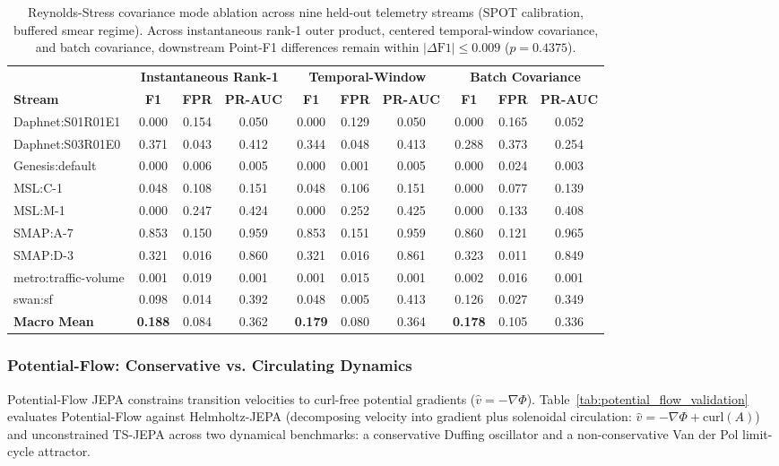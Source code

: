 \begin{table}[t]
\centering
\scriptsize
\caption{Reynolds-Stress covariance mode ablation across nine held-out telemetry streams (SPOT calibration, buffered smear regime). Across instantaneous rank-1 outer product, centered temporal-window covariance, and batch covariance, downstream Point-F1 differences remain within $|\Delta\mathrm{F1}| \le 0.009$ ($p=0.4375$).}\label{tab:reynolds_covmodes}
\scriptsize
\setlength{\tabcolsep}{2.5pt}
\begin{tabular}{@{}lccccccccc@{}}
\toprule
& \multicolumn{3}{c}{\textbf{Instantaneous Rank-1}} & \multicolumn{3}{c}{\textbf{Temporal-Window}} & \multicolumn{3}{c}{\textbf{Batch Covariance}} \\
\cmidrule(lr){2-4} \cmidrule(lr){5-7} \cmidrule(lr){8-10}
\textbf{Stream} & \textbf{F1} & \textbf{FPR} & \textbf{PR-AUC} & \textbf{F1} & \textbf{FPR} & \textbf{PR-AUC} & \textbf{F1} & \textbf{FPR} & \textbf{PR-AUC} \\
\midrule
Daphnet:S01R01E1 & 0.000 & 0.154 & 0.050 & 0.000 & 0.129 & 0.050 & 0.000 & 0.165 & 0.052 \\
Daphnet:S03R01E0 & 0.371 & 0.043 & 0.412 & 0.344 & 0.048 & 0.413 & 0.288 & 0.373 & 0.254 \\
Genesis:default  & 0.000 & 0.006 & 0.005 & 0.000 & 0.001 & 0.005 & 0.000 & 0.024 & 0.003 \\
MSL:C-1          & 0.048 & 0.108 & 0.151 & 0.048 & 0.106 & 0.151 & 0.000 & 0.077 & 0.139 \\
MSL:M-1          & 0.000 & 0.247 & 0.424 & 0.000 & 0.252 & 0.425 & 0.000 & 0.133 & 0.408 \\
SMAP:A-7         & 0.853 & 0.150 & 0.959 & 0.853 & 0.151 & 0.959 & 0.860 & 0.121 & 0.965 \\
SMAP:D-3         & 0.321 & 0.016 & 0.860 & 0.321 & 0.016 & 0.861 & 0.323 & 0.011 & 0.849 \\
metro:traffic-volume & 0.001 & 0.019 & 0.001 & 0.001 & 0.015 & 0.001 & 0.002 & 0.016 & 0.001 \\
swan:sf          & 0.098 & 0.014 & 0.392 & 0.048 & 0.005 & 0.413 & 0.126 & 0.027 & 0.349 \\
\midrule
\textbf{Macro Mean} & \textbf{0.188} & 0.084 & 0.362 & \textbf{0.179} & 0.080 & 0.364 & \textbf{0.178} & 0.105 & 0.336 \\
\bottomrule
\end{tabular}
\end{table}

\subsubsection{Potential-Flow: Conservative vs. Circulating Dynamics}
Potential-Flow JEPA constrains transition velocities to curl-free potential gradients ($\hat{v} = -\nabla\Phi$). Table~\ref{tab:potential_flow_validation} evaluates Potential-Flow against Helmholtz-JEPA (decomposing velocity into gradient plus solenoidal circulation: $\hat{v} = -\nabla\Phi + \text{curl}(A)$) and unconstrained TS-JEPA across two dynamical benchmarks: a conservative Duffing oscillator and a non-conservative Van der Pol limit-cycle attractor.


